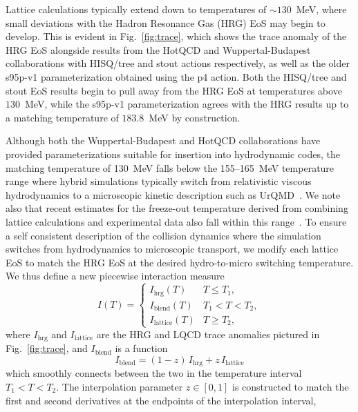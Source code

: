 \documentclass[aps,prc,reprint,amsmath,nofootinbib,superscriptaddress]{revtex4-1}
\begin{document}
Lattice calculations typically extend down to temperatures of ${\sim}130$~MeV, where small deviations with the Hadron Resonance Gas (HRG) EoS may begin to develop.
This is evident in Fig.~\ref{fig:trace}, which shows the trace anomaly of the HRG EoS alongside results from the HotQCD and Wuppertal-Budapest collaborations with HISQ/tree and stout actions respectively, as well as the older s95p-v1 parameterization obtained using the p4 action.  
Both the HISQ/tree and stout EoS results begin to pull away from the HRG EoS at temperatures above $130$~MeV, while the s95p-v1 parameterization agrees with the HRG results up to a matching temperature of $183.8$~MeV by construction.

Although both the Wuppertal-Budapest and HotQCD collaborations have provided parameterizations suitable for insertion into hydrodynamic codes, the matching temperature of 130~MeV falls below the 155--165~MeV temperature range where hybrid simulations typically switch from relativistic viscous hydrodynamics to a microscopic kinetic description such as UrQMD~\cite{Bass:1998ca,Bleicher:1999xi}.  
We note also that recent estimates for the freeze-out temperature derived from combining lattice calculations and experimental data also fall within this range~\cite{Bazavov:2014xya, Adare:2015aqk}.  
To ensure a self consistent description of the collision dynamics where the simulation switches from hydrodynamics to microscopic transport, we modify each lattice EoS to match the HRG EoS at the desired hydro-to-micro switching temperature. We thus define a new piecewise interaction measure
\begin{equation}
 \label{interaction}
 I(T) =
  \begin{cases}
   I_\text{hrg}(T)	& T \le T_1, \\
   I_\text{blend}(T)	& T_1 < T < T_2, \\ 
   I_\text{lattice}(T)	& T \ge T_2,
  \end{cases}
\end{equation}
where $I_\text{hrg}$ and $I_\text{lattice}$ are the HRG and LQCD trace anomalies pictured in Fig.~\ref{fig:trace}, and $I_\text{blend}$ is a function 
\begin{equation}
  \label{interpolation}
  I_\text{blend} = (1-z)\, I_\text{hrg} + z\, I_\text{lattice}
\end{equation}
which smoothly connects between the two in the temperature interval $T_1 < T < T_2$. The interpolation parameter $z \in [0,1]$ is constructed to match the first and second derivatives at the endpoints of the interpolation interval,
\end{document}
